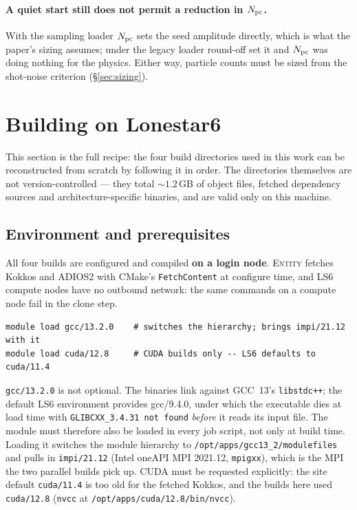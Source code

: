 \documentclass[11pt,a4paper]{article}
\newcommand{\code}[1]{\texttt{\small #1}}
\newcommand{\Npc}{N_{\rm pc}}
\begin{document}
\paragraph{A quiet start still does not permit a reduction in $\Npc$.} With the
sampling loader $\Npc$ sets the seed amplitude directly, which is what the paper's
sizing assumes; under the legacy loader round-off set it and $\Npc$ was doing nothing
for the physics. Either way, particle counts must be sized from the shot-noise
criterion (\S\ref{sec:sizing}).

\section{Building on Lonestar6}
\label{sec:builds}

This section is the full recipe: the four build directories used in this work can be
reconstructed from scratch by following it in order. The directories themselves are
not version-controlled --- they total ${\sim}1.2$\,GB of object files, fetched
dependency sources and architecture-specific binaries, and are valid only on this
machine.

\subsection{Environment and prerequisites}

All four builds are configured and compiled \textbf{on a login node}. \textsc{Entity}
fetches Kokkos and ADIOS2 with CMake's \code{FetchContent} at configure time, and LS6
compute nodes have no outbound network: the same commands on a compute node fail in
the clone step.

\begin{lstlisting}
module load gcc/13.2.0    # switches the hierarchy; brings impi/21.12 with it
module load cuda/12.8     # CUDA builds only -- LS6 defaults to cuda/11.4
\end{lstlisting}

\code{gcc/13.2.0} is not optional. The binaries link against GCC~13's
\code{libstdc++}; the default LS6 environment provides gcc/9.4.0, under which the
executable dies at load time with \code{GLIBCXX\_3.4.31 not found} \emph{before} it
reads its input file. The module must therefore also be loaded in every job script,
not only at build time. Loading it switches the module hierarchy to
\code{/opt/apps/gcc13\_2/modulefiles} and pulls in \code{impi/21.12} (Intel oneAPI MPI
2021.12, \code{mpigxx}), which is the MPI the two parallel builds pick up. CUDA must be
requested explicitly: the site default \code{cuda/11.4} is too old for the fetched
Kokkos, and the builds here used \code{cuda/12.8} (\code{nvcc} at
\code{/opt/apps/cuda/12.8/bin/nvcc}).
\end{document}
